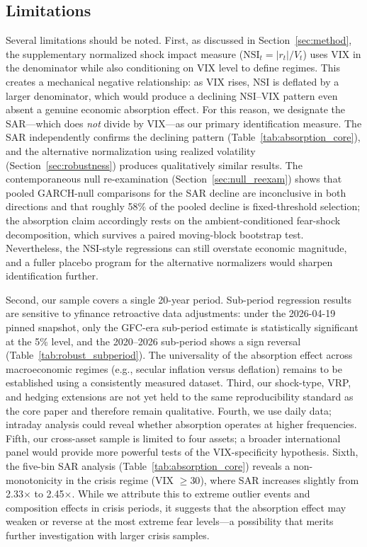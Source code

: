 \documentclass[12pt,a4paper]{article}
\begin{document}
\subsection{Limitations}

Several limitations should be noted. First, as discussed in Section~\ref{sec:method}, the supplementary normalized shock impact measure ($\text{NSI}_t = |r_t| / V_t$) uses VIX in the denominator while also conditioning on VIX level to define regimes. This creates a mechanical negative relationship: as VIX rises, NSI is deflated by a larger denominator, which would produce a declining NSI--VIX pattern even absent a genuine economic absorption effect. For this reason, we designate the SAR---which does \textit{not} divide by VIX---as our primary identification measure. The SAR independently confirms the declining pattern (Table~\ref{tab:absorption_core}), and the alternative normalization using realized volatility (Section~\ref{sec:robustness}) produces qualitatively similar results. The contemporaneous null re-examination (Section~\ref{sec:null_reexam}) shows that pooled GARCH-null comparisons for the SAR decline are inconclusive in both directions and that roughly 58\% of the pooled decline is fixed-threshold selection; the absorption claim accordingly rests on the ambient-conditioned fear-shock decomposition, which survives a paired moving-block bootstrap test. Nevertheless, the NSI-style regressions can still overstate economic magnitude, and a fuller placebo program for the alternative normalizers would sharpen identification further.

Second, our sample covers a single 20-year period. Sub-period regression results are sensitive to yfinance retroactive data adjustments: under the 2026-04-19 pinned snapshot, only the GFC-era sub-period estimate is statistically significant at the 5\% level, and the 2020--2026 sub-period shows a sign reversal (Table~\ref{tab:robust_subperiod}). The universality of the absorption effect across macroeconomic regimes (e.g., secular inflation versus deflation) remains to be established using a consistently measured dataset. Third, our shock-type, VRP, and hedging extensions are not yet held to the same reproducibility standard as the core paper and therefore remain qualitative. Fourth, we use daily data; intraday analysis could reveal whether absorption operates at higher frequencies. Fifth, our cross-asset sample is limited to four assets; a broader international panel would provide more powerful tests of the VIX-specificity hypothesis. Sixth, the five-bin SAR analysis (Table~\ref{tab:absorption_core}) reveals a non-monotonicity in the crisis regime (VIX $\geq 30$), where SAR increases slightly from 2.33$\times$ to 2.45$\times$. While we attribute this to extreme outlier events and composition effects in crisis periods, it suggests that the absorption effect may weaken or reverse at the most extreme fear levels---a possibility that merits further investigation with larger crisis samples.
\end{document}
